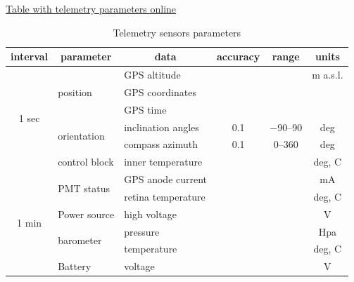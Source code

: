 \documentclass[final,5p,times,twocolumn]{elsarticle}
\begin{document}
\begin{table}[bth]
\centering
\caption{Telemetry sensors parameters}
\label{tab:telemetry_sensors}
\href{https://docs.google.com/spreadsheets/d/1MEnVT2ue2mNZBabXCuhiacFWPkZbzGb2yeg4IZIXusI/edit?usp=sharing}{Table with telemetry parameters online} \\

\vspace{1pc}
\begin{tabular}{|c|l|l|c|c|c|}
\hline
\multicolumn{1}{|c|}{interval} & \multicolumn{1}{c|}{parameter} & \multicolumn{1}{c|}{data}  & \multicolumn{1}{|c|}{accuracy} & \multicolumn{1}{c|}{range}  & \multicolumn{1}{c|}{units} \\
\hline
\hline
\multirow{6}{*}{1 sec} & \multirow{3}{*}{position} &GPS altitude &&& m a.s.l.\\
                                                      \cline{3-6}
                       &                              & GPS coordinates &&&\\
                                                      \cline{3-6}
                       &                              & GPS time &&&\\
                       \cline{2-6}
                       & \multirow{2}{*}{orientation} & inclination angles& 0.1&$-$90--90&deg\\
                                                      \cline{3-6}
                       &                              & compass azimuth &0.1&0--360&deg\\
                       \cline{2-6}
                       &control block                 & inner temperature&&&deg, C\\
\hline
\multirow{7}{*}{1 min} & \multirow{2}{*}{PMT status} &GPS anode current &&& mA\\
                                                      \cline{3-6}
                       &                              & retina temperature &&& deg, C\\
                       \cline{2-6}
                       & Power source                 & high voltage &&& V\\
                       \cline{2-6}
                       & \multirow{2}{*}{barometer}   & pressure & && Hpa\\
                                                      \cline{3-6}
                       &                              & temperature&&&deg, C\\
                       \cline{2-6}
                       & Battery                      & voltage &&& V\\

\end{tabular}
\end{table}
\end{document}
